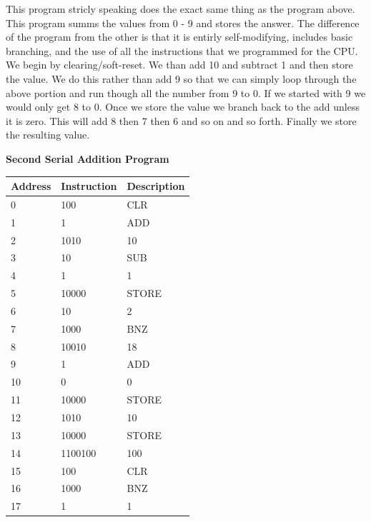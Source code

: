\documentclass[12pt]{article}
\begin{document}
\newpage
This program stricly speaking does the exact same thing as the program above. This program summs the values from 0 - 9 and stores the answer. The difference of the program from the other is that it is entirly self-modifying, includes basic branching, and the use of all the instructions that we programmed for the CPU. We begin by clearing/soft-reset. We than add 10 and subtract 1 and then store the value. We do this rather than add 9 so that we can simply loop through the above portion and run though all the number from 9 to 0. If we started with 9 we would only get 8 to 0. Once we store the value we branch back to the add unless it is zero. This will add 8 then 7 then 6 and so on and so forth. Finally we store the resulting value.
\begin{center}
\textbf{Second Serial Addition Program}\\
\begin{tabular}{|l|l|l|}
\hline
Address & Instruction & Description \\
\hline
0       & 100	&CLR       \\
1       & 1		&ADD           \\
2       & 1010	&10        \\
3       & 10	&SUB         \\
4       & 1		&1          \\
5       & 10000	&STORE       \\
6       & 10	&2          \\
7       & 1000	&BNZ        \\
8       & 10010	&18       \\
9       & 1 	&ADD          \\
10      & 0		&0           \\
11      & 10000	&STORE       \\
12      & 1010	&10        \\
13      & 10000	&STORE       \\
14      & 1100100	&100     \\
15      & 100	&CLR         \\
16      & 1000	&BNZ        \\
17      & 1   	&1        \\
\hline
\end{tabular}
\end{center}
\end{document}

